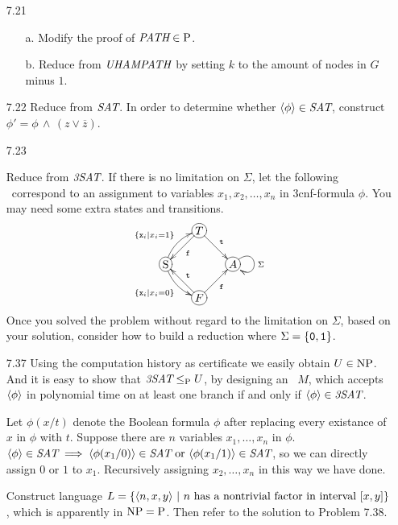 \begin{itemize}
	\item[7.21]
	\begin{itemize}
		\item[a.] Modify the proof of $\textit{PATH} \in \Poly$.
		\item[b.] Reduce from $\IT{UHAMPATH}$ by setting $k$ to the amount of nodes in $G$ minus $1$.
	\end{itemize}

	\item[7.22]
	Reduce from $\IT{SAT}$. In order to determine whether $\Bra{\phi} \in \IT{SAT}$, construct $\phi' = \phi \,\wedge\,(z \vee \overline{z})$.
	
	\item[7.23]
	\Omit
	
	\item[\Star 7.36] 
	Reduce from $\IT{3SAT}$. If there is no limitation on $\Sigma$, let the following \DFA\ correspond to an assignment to variables $x_1, x_2, \dots, x_n$ in 3cnf-formula $\phi$. You may need some extra states and transitions.
	$$
		\xymatrix@ur@R=2pc@C=2pc{
			*+[o][F-]{\RM{S}} \ar@/^/[r]^{\{ \TT{x}_i | x_i = 1 \}} \ar@/_/[d]_{\{ \TT{x}_i | x_i = 0 \}} &
			*+[o][F-]{T} \ar^{\TT{t}}[d] \ar^{\TT{f}}[l] \\
			*+[o][F-]{F} \ar_{\TT{f}}[r] \ar_{\TT{t}}[u] & 
			*+[o][F-]{A} \ar@(ur,rd)[]^{\Sigma}
		}
	$$
	Once you solved the problem without regard to the limitation on $\Sigma$, based on your solution, consider how to build a reduction where $\Sigma = \{ \TT{0}, \TT{1} \}$.
	
	\item[7.37]
	Using the computation history as certificate we easily obtain $U \in \NPoly$. And it is easy to show that $\IT{3SAT} \LeqP U$, by designing an \NTM\ $M$, which accepts $\Bra{\phi}$ in polynomial time on at least one branch if and only if $\Bra{\phi} \in \IT{3SAT}$.
	
	\item[\Star 7.38]
	Let $\phi(x/t)$ denote the Boolean formula $\phi$ after replacing every existance of $x$ in $\phi$ with $t$. Suppose there are $n$ variables $x_1, \dots, x_n$ in $\phi$. $\Bra{\phi} \in \IT{SAT} \implies \Bra{\phi(x_1/0)} \in \IT{SAT} \text{ or } \Bra{\phi(x_1/1)} \in \IT{SAT}$, so we can directly assign $0$ or $1$ to $x_1$. Recursively assigning $x_2, \dots, x_n$ in this way we have done.
	
	\item[\Star 7.39]
	Construct language $L = \{ \Bra{n, x, y} \ | \ \text{$n$ has a nontrivial factor in interval $[x, y]$} \}$, which is apparently in $\NPoly = \Poly$. Then refer to the solution to Problem 7.38.
	
	\item[\Star 7.40] 
	\Omit
	
\end{itemize}
